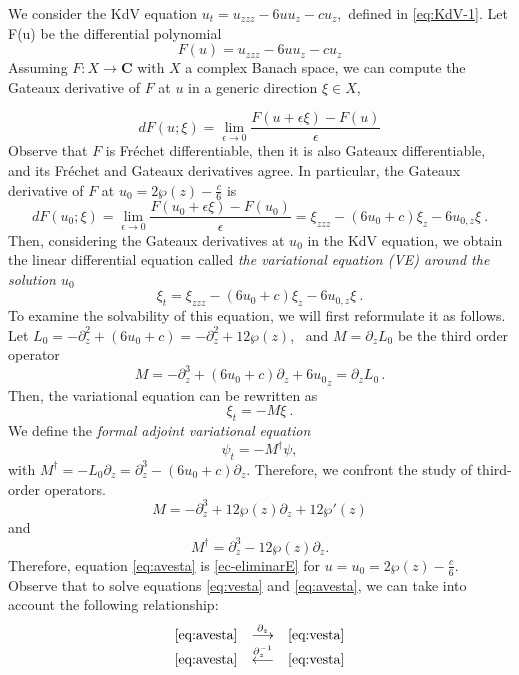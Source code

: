 \documentclass[a4paper,12pt]{article}
\newcommand{\coC}{\mathbf{C}}
\begin{document}
\bigskip


We consider the KdV equation 
\(
u_t = u_{zzz}-6u u_z  -cu_z ,
\)
defined in \eqref{eq:KdV-1}. Let F(u) be the differential polynomial 
\[F(u)=u_{zzz}-6u u_z  -cu_z \]
Assuming $F: X \rightarrow \coC$ with $X$ a complex Banach space, we can compute the Gateaux derivative of $F$ at $u$ in a generic direction $\xi \in X$,

\[
dF(u ;\xi) = \lim_{\epsilon\rightarrow 0}\frac{F(u+\epsilon\xi)-F(u)}{\epsilon}
\]
Observe that $F$  is Fr\'echet differentiable, then it is also Gateaux differentiable, and its Fr\'echet and Gateaux derivatives agree. In particular, the Gateaux derivative of $F$ at $u_0 =2\wp(z)-\frac{c}{6}  $ is 
\[
dF(u_0 ;\xi) = \lim_{\epsilon\rightarrow 0}
\frac{F(u_0+\epsilon\xi)-F(u_0)}{\epsilon}=
\xi_{zzz}-(6 u_0 +c) \xi_z -6u_{0,z} \xi \ .
\]
Then, considering the Gateaux derivatives at $u_0$ in the KdV equation, we obtain the linear differential equation called {\it the variational equation (VE) around the solution $u_0$ }
\[
\xi_t = \xi_{zzz}-(6 u_0 +c) \xi_z -6u_{0,z} \xi \ .
\]
To examine the solvability of this equation, we will first reformulate it as follows. Let $L_0 = -\partial_z^2 +(6 u_0 +c)= -\partial_z^2 + 12 \wp (z)$, \ and $M=\partial_z L_0 $ be the third order operator 
\begin{equation}\label{eq-operator-M}
M={-\partial_z^3+(6u_0+c)\partial_z  +6{u_0}_z
  } = \partial_z L_0 \,  .
\end{equation}
Then, the variational equation can be rewritten as 
{ \begin{equation}\label{eq:vesta}
 \xi_t= - M\xi \ .
\end{equation}}
We define the {\it formal adjoint variational equation} 
\begin{equation}\label{eq:avesta}
 \psi_t = - M^\dag \psi  ,  
\end{equation}
with $M^\dag = - L_0 \partial_z  =\partial_z^3-(6u_0 +c)\partial_z$.
Therefore, we confront the study of third-order operators.
\begin{equation}\label{eq-operator-M-cnoidal}
M=-\partial_z^3+12\wp(z)\partial_z  + 12\wp'(z) 
\end{equation}
and
\begin{equation}\label{eq:avesta-cnoidal}
    M^\dag  = \partial_z^3  -12\wp(z)\partial_z .
\end{equation}
Therefore, equation  \eqref{eq:avesta} is \eqref{ec-eliminarE} for $u=u_0 = 2\wp(z)-\frac{c}{6}   $. Observe that to solve equations \eqref{eq:vesta} and \eqref{eq:avesta}, we can take into account the following relationship:
\begin{equation}
\begin{array}{ccc}
     \eqref{eq:avesta} & \overset{\partial_z} \longrightarrow & \eqref{eq:vesta}\\
    \eqref{eq:avesta} & \overset{\partial_z^{-1}}\longleftarrow &\eqref{eq:vesta}
\end{array}\label{equiv-VEs}
\end{equation}
\end{document}
